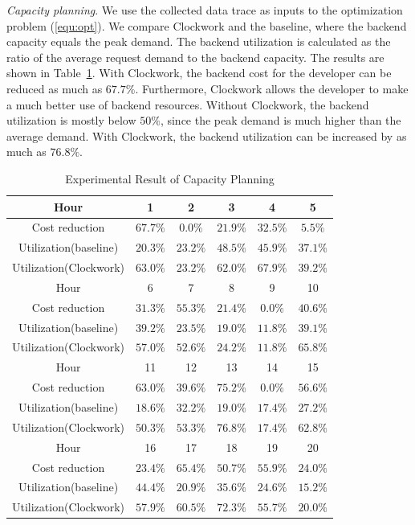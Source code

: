\emph{Capacity planning}. We use the collected data trace as inputs to the optimization problem (\ref{equ:opt}). We compare Clockwork and the baseline, where the backend capacity equals the peak demand. The backend utilization is calculated as the ratio of the average request demand to the backend capacity. The results are shown in Table~\ref{tab:exp}. With Clockwork, the backend cost for the developer can be reduced as much as $67.7\%$. Furthermore, Clockwork allows the developer to make a much better use of backend resources. Without Clockwork, the backend utilization is mostly below $50\%$, since the peak demand is much higher than the average demand. With Clockwork, the backend utilization can be increased  by as much as $76.8\%$. 

\begin{table}[t]
	\centering
	\caption{Experimental Result of Capacity Planning}
	\label{tab:exp}
	\begin{tabular}{|c|c|c|c|c|c|}
		\hline
		Hour & 1 &  2 & 3 & 4  &5\\
		\hline	
		Cost reduction &$67.7\%$ &$0.0\%$& $21.9\%$& $32.5\%$&$5.5\%$\\
		Utilization(baseline) &$20.3\%$ &$23.2\%$& $48.5\%$& $45.9\%$&$37.1\%$\\
		Utilization(Clockwork)&$63.0\%$ &$23.2\%$& $62.0\%$& $67.9\%$&$39.2\%$\\
		\hline
		Hour &6&7&8&9&10\\
		\hline
		Cost reduction&$31.3\%$ &$55.3\%$& $21.4\%$&$0.0\%$& $40.6\%$\\
		Utilization(baseline) & $39.2\%$ &$23.5\%$& $19.0\%$&$11.8\%$& $39.1\%$\\
		Utilization(Clockwork)&$57.0\%$ &$52.6\%$& $24.2\%$&$11.8\%$& $65.8\%$\\
		\hline
		Hour & 11 &  12  &13&14&15\\
		\hline
		Cost reduction &$63.0\%$ &$39.6\%$&$75.2\%$& $0.0\%$& $56.6\%$\\
		Utilization(baseline) & $18.6\%$ &$32.2\%$&$19.0\%$& $17.4\%$& $27.2\%$\\
		Utilization(Clockwork)&$50.3\%$ &$53.3\%$&$76.8\%$& $17.4\%$& $62.8\%$\\
		\hline
		Hour  & 16&17&18&19&20\\
		\hline
		Cost reduction &$23.4\%$ &$65.4\%$& $50.7\%$& $55.9\%$& $24.0\%$\\
		Utilization(baseline) & $44.4\%$ &$20.9\%$& $35.6\%$& $24.6\%$& $15.2\%$\\
		Utilization(Clockwork)&$57.9\%$ &$60.5\%$& $72.3\%$& $55.7\%$& $20.0\%$\\
		\hline
	\end{tabular}
	\vspace{-0.6cm}
\end{table}


